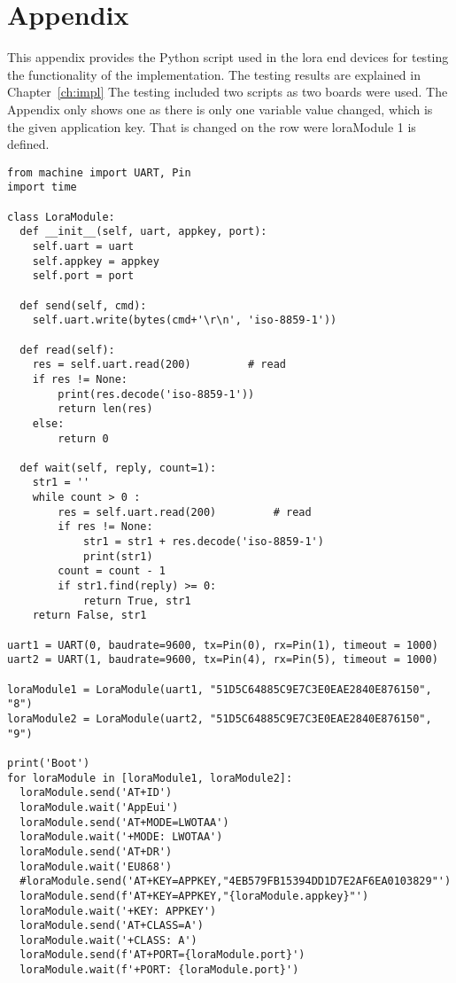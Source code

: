 
\chapter{Appendix}\label{appx:testing}

This appendix provides the Python script used in the \gls{lora} end devices for testing the functionality of the implementation.
The testing results are explained in Chapter~\ref{ch:impl}
The testing included two scripts as two boards were used.
The Appendix only shows one as there is only one variable value changed, which is the given application key.
That is changed on the row were loraModule 1 is defined.


\begin{verbatim}
from machine import UART, Pin
import time

class LoraModule:
  def __init__(self, uart, appkey, port):
    self.uart = uart
    self.appkey = appkey
    self.port = port

  def send(self, cmd):
    self.uart.write(bytes(cmd+'\r\n', 'iso-8859-1'))
  
  def read(self):
    res = self.uart.read(200)         # read 
    if res != None:
        print(res.decode('iso-8859-1'))
        return len(res)
    else:
        return 0
  
  def wait(self, reply, count=1):
    str1 = ''
    while count > 0 :
        res = self.uart.read(200)         # read 
        if res != None:
            str1 = str1 + res.decode('iso-8859-1')
            print(str1)
        count = count - 1
        if str1.find(reply) >= 0:
            return True, str1
    return False, str1

uart1 = UART(0, baudrate=9600, tx=Pin(0), rx=Pin(1), timeout = 1000)
uart2 = UART(1, baudrate=9600, tx=Pin(4), rx=Pin(5), timeout = 1000)

loraModule1 = LoraModule(uart1, "51D5C64885C9E7C3E0EAE2840E876150", "8")
loraModule2 = LoraModule(uart2, "51D5C64885C9E7C3E0EAE2840E876150", "9")

print('Boot')
for loraModule in [loraModule1, loraModule2]:
  loraModule.send('AT+ID')
  loraModule.wait('AppEui')
  loraModule.send('AT+MODE=LWOTAA')
  loraModule.wait('+MODE: LWOTAA')
  loraModule.send('AT+DR')
  loraModule.wait('EU868')
  #loraModule.send('AT+KEY=APPKEY,"4EB579FB15394DD1D7E2AF6EA0103829"')
  loraModule.send(f'AT+KEY=APPKEY,"{loraModule.appkey}"')
  loraModule.wait('+KEY: APPKEY')
  loraModule.send('AT+CLASS=A')
  loraModule.wait('+CLASS: A')
  loraModule.send(f'AT+PORT={loraModule.port}')
  loraModule.wait(f'+PORT: {loraModule.port}')


\end{verbatim}
